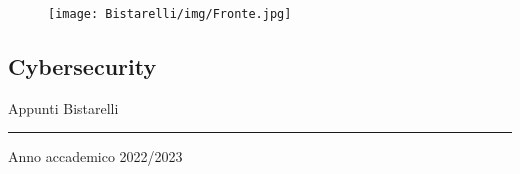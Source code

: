 
\thispagestyle{empty} %
\newcommand\hr{\par\vspace{-.5\ht\strutbox}\noindent\hrulefill\par}

\noindent %
\begin{figure}
    \centering
    \texttt{[image: Bistarelli/img/Fronte.jpg]}
\end{figure}
\centering
\vspace{2cm}
\subsection*{Cybersecurity}
\vspace{2cm}
\Large{Appunti Bistarelli}
\vspace{2cm}
\rule{\textwidth}{0.4pt}
\vspace{2cm}
\small{Anno accademico 2022/2023}

